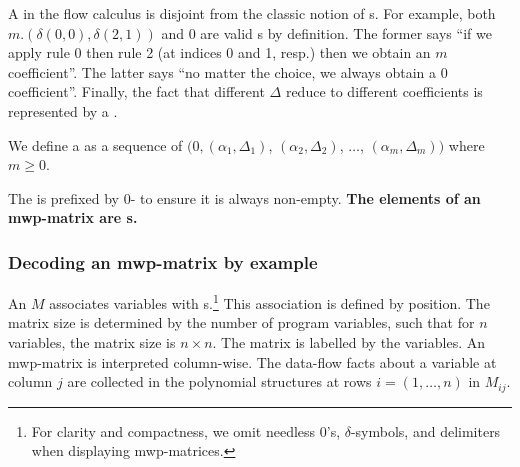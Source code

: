 \noindent
A  in the flow calculus is disjoint from the classic notion of
s. For example, both \(m.(\delta(0,0),\delta(2,1))\)
and \(0\) are valid s by definition. The former says
\enquote{if we apply rule 0 then rule 2 (at indices 0 and 1, resp.) then we
obtain an \(m\) coefficient}. The latter says \enquote{no matter the
choice, we always obtain a \(0\) coefficient}. Finally, the fact
that different \(\Delta\) reduce to different
coefficients is represented by a \emph{}.

\begin{definition}
We define a  as a sequence of 
\(\big(0,(\alpha_1,\Delta_1)\), \((\alpha_2,\Delta_2)\), \(\dots\), \((\alpha_m,
\Delta_m)\big)\) where \(m \geq 0\).
\end{definition}

\noindent The  is prefixed by
\(0\)- to ensure it is always non-empty. \textbf{The
elements of an mwp-matrix are s.}

\subsubsection{Decoding an mwp-matrix by example}
\label{subsec:read-mat}

An  \(M\) associates variables with
s.\footnote{ For clarity and compactness, we omit
needless \(0\)'s, \(\delta\)-symbols, and delimiters
when displaying mwp-matrices.} This association is defined by position. The
matrix size is determined by the number of program variables, such that for
\(n\) variables, the matrix size is \(n \times n\). The matrix is labelled by
the variables. An mwp-matrix is interpreted {column-wise}. The data-flow facts
about a variable at column \(j\) are collected in the polynomial
structures at rows \(i=(1, \ldots, n)\) in \(M_{ij}\).

